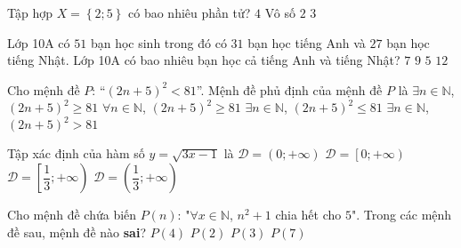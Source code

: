 \begin{ex}%
	Tập hợp $X=\left\{2;5\right\}$ có bao nhiêu phần tử?
	\choice
	{$4$}
	{Vô số}
	{\True $2$}
	{$3$}
\end{ex}
\begin{ex}%
	Lớp 10A có $51$ bạn học sinh trong đó có $31$ bạn học tiếng Anh và $27$ bạn học tiếng Nhật. Lớp 10A có bao nhiêu bạn học cả tiếng Anh và tiếng Nhật?
	\choice
	{\True $7$}
	{$9$}
	{$5$}
	{$12$}
\end{ex}
\begin{ex}%
	Cho mệnh đề $P$: “$\left(2n+5\right)^2< 81$”. Mệnh đề phủ định của mệnh đề $P$ là
	\choice
	{\True $\exists n \in \mathbb{N}$, $\left(2n+5\right)^2\ge 81$}
	{$\forall n \in \mathbb{N}$, $\left(2n+5\right)^2\ge 81$}
	{$\exists n \in \mathbb{N}$, $\left(2n+5\right)^2\le 81$}
	{$\exists n \in \mathbb{N}$, $\left(2n+5\right)^2> 81$}
\end{ex}
\begin{ex}%
	Tập xác định của hàm số $y=\sqrt{3x-1}$ là
	\choice
	{$\mathscr{D}=\left(0;+\infty\right)$}
	{$\mathscr{D}=\left[0;+\infty\right)$}
	{\True $\mathscr{D}=\left[\dfrac{1}{3};+\infty\right)$}
	{$\mathscr{D}=\left(\dfrac{1}{3};+\infty\right)$}
	\loigiai{
		Hàm số $y=\sqrt{3x-1}$ xác định $\Leftrightarrow 3x-1\ge 0\Leftrightarrow x\ge\dfrac{1}{3}$.\\
		Vậy $\mathscr{D}=\left[\dfrac{1}{3};+\infty\right)$.
	}
\end{ex}
\begin{ex}%
	Cho mệnh đề chứa biến $P(n)$: "$\forall x \in \mathbb{N}$, $n^2+1$ chia hết cho $5$". Trong các mệnh đề sau, mệnh đề nào \textbf{sai}?
	\choice
	{\True $P(4)$}
	{$P(2)$}
	{$P(3)$}
	{$P(7)$}
\end{ex}
